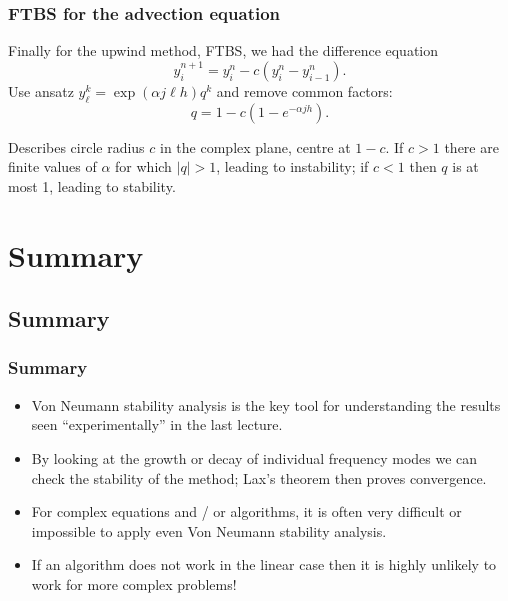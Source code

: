 \documentclass{beamer}
\begin{document}
\begin{frame}
  \frametitle{FTBS for the advection equation}

  Finally for the upwind method, FTBS, we had the difference equation
  \begin{equation*}
    y_i^{n+1} = y_i^n - c \left( y_{i}^n - y_{i-1}^n \right).
  \end{equation*}
  Use ansatz $y_{\ell}^k =  \exp (\alpha j \ell h) q^k$
  and remove common factors:
  \begin{equation*}
    q = 1 - c \left( 1 - e^{-\alpha j h} \right).
  \end{equation*} \pause

  Describes circle radius $c$ in the complex plane, centre at $1 -
  c$. \pause If $c > 1$ there are finite values of $\alpha$ for which
  $|q| > 1$, leading to instability; if $c < 1$ then $q$ is at most 1,
  leading to stability.

\end{frame}

\section{Summary}

\subsection{Summary}

\begin{frame}
  \frametitle{Summary}

  \begin{itemize}
  \item Von Neumann stability analysis is the key tool for
    understanding the results seen ``experimentally'' in the last
    lecture.
  \item By looking at the growth or decay of individual frequency
    modes we can check the stability of the method; Lax's theorem then
    proves convergence.
  \item For complex equations and / or algorithms, it is often very
    difficult or impossible to apply even Von Neumann stability
    analysis.
  \item If an algorithm does not work in the linear case then it is
    highly unlikely to work for more complex problems!
  \end{itemize}

\end{frame}
\end{document}
